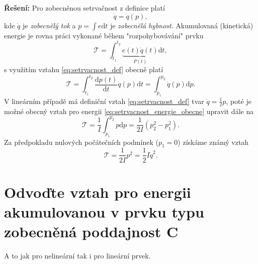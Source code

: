 \documentclass[twoside]{article}
\begin{document}
\textbf{Řešení:} 
Pro zobecněnou setrvačnost z definice platí 
\begin{equation}
	\dot{q} = \dot{q}(p),
	\label{eq:setrvacnost_def}
\end{equation}
kde $\dot{q}$ je \textit{zobecnělý tok} a $p = \int e \text{d}t$ je \textit{zobecnělá hybnost}.
Akumulovaná (kinetická) energie je rovna práci vykonané během "rozpohybovávání" prvku
\begin{equation}
	\mathcal{T} = \int_{t_1}^{t_2} \underbrace{e(t) \dot{q}(t)}_{P(t)} \text{d}t,
	\label{eq:setrvacnost_obecne}
\end{equation}
s využitím vztahu \eqref{eq:setrvacnost_def} obecně platí
\begin{equation}
	\mathcal{T} = \int_{t_1}^{t_2} \frac{\text{d}p(t)}{\text{d}t} \dot{q}(p) \text{d}t = \int_{p_1}^{p_2} \dot{q}(p) \text{d}p.
	\label{eq:setrvacnost_energie_obecne}
\end{equation}
V lineárním případě má definiční vztah \eqref{eq:setrvacnost_def} tvar $\dot{q} = \frac{1}{I} p$,
poté je možné obecný vztah pro energii \eqref{eq:setrvacnost_energie_obecne} upravit dále na
\begin{equation}
	\mathcal{T} = \frac{1}{I} \int_{p_1}^{p_2} p \text{d}p = \frac{1}{2I} (p_2^2 - p_1^2).
\end{equation}
Za předpokladu nulových počátečních podmínek ($p_1 = 0$) získáme známý vztah
\begin{equation}
	\mathcal{T} = \frac{1}{2I}p^2 = \frac{1}{2} I \dot{q}^2.
\end{equation}


\section{Odvoďte vztah pro energii akumulovanou v prvku typu zobecněná poddajnost C}
A to jak pro nelineární tak i pro lineární prvek.
\end{document}
